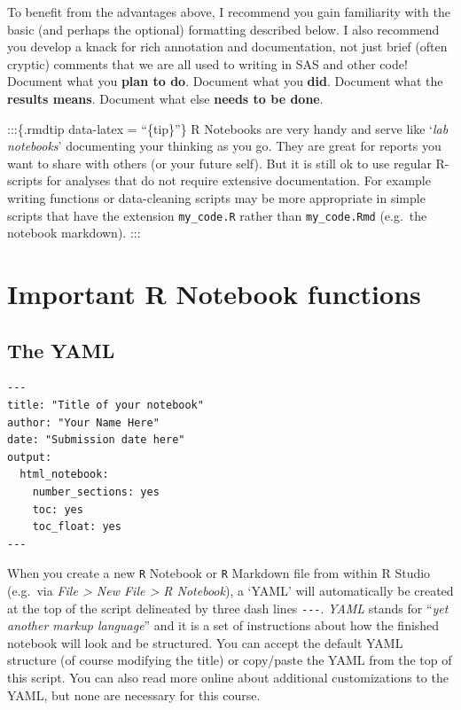 \documentclass[
]{book}
\begin{document}
To benefit from the advantages above, I recommend you gain familiarity with the basic (and perhaps the optional) formatting described below. I also recommend you develop a knack for rich annotation and documentation, not just brief (often cryptic) comments that we are all used to writing in SAS and other code! Document what you \textbf{plan to do}. Document what you \textbf{did}. Document what the \textbf{results means}. Document what else \textbf{needs to be done}.

:::\{.rmdtip data-latex = ``\{tip\}''\}
R Notebooks are very handy and serve like `\emph{lab notebooks}' documenting your thinking as you go. They are great for reports you want to share with others (or your future self). But it is still ok to use regular R-scripts for analyses that do not require extensive documentation. For example writing functions or data-cleaning scripts may be more appropriate in simple scripts that have the extension \texttt{my\_code.R} rather than \texttt{my\_code.Rmd} (e.g.~the notebook markdown).
:::

\hypertarget{important-r-notebook-functions}{%
\section{Important R Notebook functions}\label{important-r-notebook-functions}}

\hypertarget{the-yaml}{%
\subsection{The YAML}\label{the-yaml}}

\begin{verbatim}
---
title: "Title of your notebook"
author: "Your Name Here"
date: "Submission date here"
output:
  html_notebook:
    number_sections: yes
    toc: yes
    toc_float: yes
---
\end{verbatim}

When you create a new \texttt{R} Notebook or \texttt{R} Markdown file from within R Studio (e.g.~via \emph{File \textgreater{} New File \textgreater{} R Notebook}), a `YAML' will automatically be created at the top of the script delineated by three dash lines \texttt{-\/-\/-}. \emph{YAML} stands for ``\emph{yet another markup language}'' and it is a set of instructions about how the finished notebook will look and be structured. You can accept the default YAML structure (of course modifying the title) or copy/paste the YAML from the top of this script. You can also read more online about additional customizations to the YAML, but none are necessary for this course.
\end{document}

